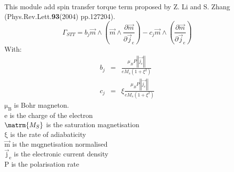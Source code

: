 This module add spin transfer torque term proposed by Z. Li and S. Zhang
(Phys.Rev.Lett.{\bf 93}(2004) pp.127204).
\begin{equation}
	\Gamma_{STT} =
	b_j\overrightarrow{m}\wedge\left(\overrightarrow{m}\wedge\frac{\partial\overrightarrow{m}}{\partial\overrightarrow{j}_e}\right)
	- c_j\overrightarrow{m}\wedge\left(\frac{\partial\overrightarrow{m}}{\partial\overrightarrow{j}_e}\right)
\end{equation}
With:
\begin{eqnarray}
	b_j&=&\frac{\mu_BP\left|\left|\overrightarrow{j_e}\right|\right|}{eM_s\left(1+\xi^2\right)}\\
	c_j&=&\xi\frac{\mu_BP\left|\left|\overrightarrow{j_e}\right|\right|}{eM_s\left(1+\xi^2\right)}
\end{eqnarray}
$\mathrm{\mu_B}$ is Bohr magneton.\\
e is the charge of the electron\\
$\matrm{M_S}$ is the saturation magnetisation\\
$\mathrm{\xi}$ is the rate of adiabaticity\\
$\mathrm{\overrightarrow{m}}$ is the mqgnetisation normalised\\
$\mathrm{\overrightarrow{j}_e}$ is the electronic current density\\
P is the polarisation rate\\